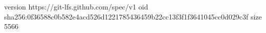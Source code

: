 version https://git-lfs.github.com/spec/v1
oid sha256:0f36588c0b582e4acd526d1221785436459b22cc13f3f1f3641045cc0d029c3f
size 5566
